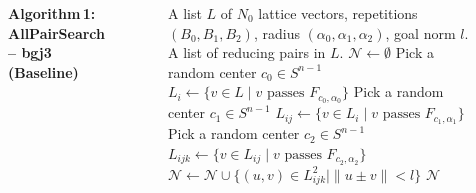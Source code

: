 \documentclass[25pt,a0paper,portrait]{tikzposter}
\begin{document}
\begin{columns}
{  %
  \noindent\textbf{Algorithm\,1: AllPairSearch – bgj3 (Baseline)}\\[-2ex]
  \noindent\rule{0.9\linewidth}{0.8pt}\\[-3ex]
  \begin{algorithmic}[1]
    \setlength{\topsep}{0pt}%
    \setlength{\partopsep}{0pt}%
    \setlength{\itemsep}{.3ex}%
    \setlength{\parskip}{0pt}%
    \Require A list $L$ of $N_0$ lattice vectors, repetitions $(B_0,B_1,B_2)$, radius $(\alpha_0,\alpha_1,\alpha_2)$, goal norm $l$.
    \Ensure A list of reducing pairs in $L$.
    \State $\mathcal{N}\gets\emptyset$
      \State Pick a random center $c_0\in S^{n-1}$
      \State $L_i\gets\{v\in L\mid v\text{ passes }F_{c_0,\alpha_0}\}$
        \State Pick a random center $c_1\in S^{n-1}$
        \State $L_{ij}\gets\{v\in L_i\mid v\text{ passes }F_{c_1,\alpha_1}\}$
          \State Pick a random center $c_2\in S^{n-1}$
          \State $L_{ijk}\gets\{v\in L_{ij}\mid v\text{ passes }F_{c_2,\alpha_2}\}$
          \State $\mathcal{N}\gets\mathcal{N}\cup\{(u,v)\in L_{ijk}^2\mid\|u\pm v\|<l\}$
        \EndFor
      \EndFor
    \EndFor
    \State \Return $\mathcal{N}$
  \end{algorithmic}\\[-2ex]
  \noindent\rule{0.9\linewidth}{0.8pt}
}


\end{columns}
\end{document}
